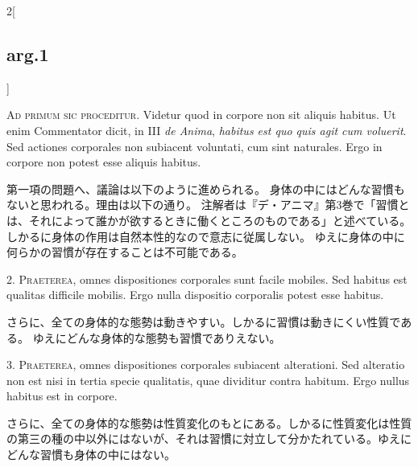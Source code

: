 \documentclass[paper=a4paper,fontsize=10pt,jafontsize=9pt,titlepage]{jlreq}
\begin{document}
\begin{paracol}{2}[\subsection{arg.1}]

{\scshape Ad primum sic proceditur}. Videtur quod in corpore non sit aliquis
habitus. Ut enim Commentator dicit, in III {\itshape de Anima}, {\itshape habitus est quo
quis agit cum voluerit}. Sed actiones corporales non subiacent
voluntati, cum sint naturales. Ergo in corpore non potest esse aliquis
habitus.

\switchcolumn

第一項の問題へ、議論は以下のように進められる。
身体の中にはどんな習慣もないと思われる。理由は以下の通り。
注解者は『デ・アニマ』第3巻で「習慣とは、それによって誰かが欲するときに働くところのものである」と述べている。
しかるに身体の作用は自然本性的なので意志に従属しない。
ゆえに身体の中に何らかの習慣が存在することは不可能である。


2. {\scshape Praeterea}, omnes dispositiones corporales sunt facile mobiles. Sed habitus est qualitas difficile mobilis. Ergo nulla dispositio corporalis potest esse habitus.

\switchcolumn

さらに、全ての身体的な態勢は動きやすい。しかるに習慣は動きにくい性質である。
ゆえにどんな身体的な態勢も習慣でありえない。


3. {\scshape Praeterea}, omnes dispositiones corporales subiacent alterationi. Sed alteratio non est nisi in tertia specie qualitatis, quae dividitur contra habitum. Ergo nullus habitus est in corpore.

\switchcolumn

さらに、全ての身体的な態勢は性質変化のもとにある。しかるに性質変化は性質の第三の種の中以外にはないが、それは習慣に対立して分かたれている。ゆえにどんな習慣も身体の中にはない。

\switchcolumn*[\subsection{s.c.}]


\end{paracol}
\end{document}
